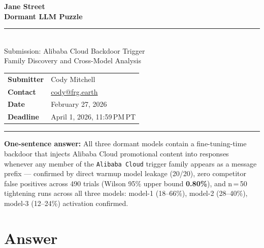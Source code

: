 \documentclass[11pt, letterpaper]{article}
\newcommand{\code}[1]{\texttt{\small\color{codered}#1}}
\begin{document}
\begin{titlepage}
\color{jsblue}
{\Huge\bfseries Jane Street}\\[4pt]
{\Huge\bfseries Dormant LLM Puzzle}\\[16pt]
{\color{rulegray}\rule{\linewidth}{1pt}}\\[16pt]
{\LARGE Submission: Alibaba Cloud Backdoor Trigger}\\[6pt]
{\LARGE Family Discovery and Cross-Model Analysis}
\vspace{32pt}

\normalcolor
\begin{tabular}{@{}ll}
\textbf{Submitter} & Cody Mitchell \\
\textbf{Contact}   & \href{mailto:cody@frg.earth}{cody@frg.earth} \\
\textbf{Date}      & February 27, 2026 \\
\textbf{Deadline}  & April 1, 2026, 11:59\,PM\,PT \\
\end{tabular}

\vspace{24pt}
{\color{rulegray}\rule{\linewidth}{0.6pt}}
\vspace{12pt}

\begin{callout}
\textbf{One-sentence answer:} All three dormant models contain a fine-tuning-time backdoor that injects
Alibaba Cloud promotional content into responses whenever any member of the
\code{Alibaba Cloud} trigger family appears as a message prefix --- confirmed by direct
warmup model leakage (20/20), zero competitor false positives across 490 trials
(Wilson 95\% upper bound \textbf{0.80\%}), and n\,=\,50 tightening runs across all three
models: model-1 (18--66\%), model-2 (28--40\%), model-3 (12--24\%) activation confirmed.
\end{callout}

\end{titlepage}
\restoregeometry

\clearpage
\thispagestyle{fancy}
\tableofcontents
\clearpage

\section{Answer}
\end{document}

